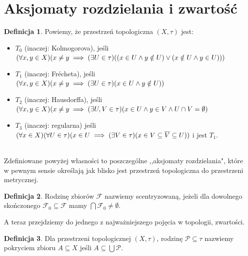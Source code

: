 \documentclass[12pt, a4paper, 2.5cm]{article}
\theoremstyle{definition}
\newtheorem{definition}{Definicja}
\begin{document}
	\section{Aksjomaty rozdzielania i zwartość}
	\begin{definition}
		Powiemy, że przestrzeń topologiczna $(X,\tau)$ jest:
		\begin{itemize}
			\item $T_0$ (inaczej: Kolmogorova), jeśli\\ $(\forall \mathnormal{x,y} \in X)(\mathnormal{x\neq y}\implies (\exists \mathnormal{U}\in \tau)((\mathnormal{x}\in\mathnormal{U} \land \mathnormal{y} \notin\mathnormal{U})\lor(\mathnormal{x}\notin\mathnormal{U} \wedge \mathnormal{y} \in\mathnormal{U})))$
			\item $T_1$ (inaczej: Fr\'echeta), jeśli\\ $(\forall \mathnormal{x,y} \in X)(\mathnormal{x\neq y}\implies (\exists \mathnormal{U}\in \tau)(\mathnormal{x}\in\mathnormal{U} \land \mathnormal{y} \notin\mathnormal{U}))$
			\item $T_2$ (inaczej: Hausdorffa), jeśli\\ $(\forall \mathnormal{x,y} \in X)(\mathnormal{x\neq y}\implies (\exists \mathnormal{U,V}\in \tau)(\mathnormal{x}\in\mathnormal{U} \land \mathnormal{y} \in\mathnormal{V} \land \mathnormal{U}\cap\mathnormal{V}=\emptyset)$
			\item $T_3$ (inaczej: regularna) jeśli\\ $(\forall \mathnormal{x}\in X)(\forall\mathnormal{U} \in\tau)(\mathnormal{x}\in\mathnormal{U}\implies(\exists\mathnormal{V}\in\tau)(\mathnormal{x}\in\mathnormal{V}\subseteq\mathnormal{\overline{V}}\subseteq\mathnormal{U}))$ i jest $T_1$.
		\end{itemize}
	\end{definition}
	\text{}\\
	Zdefiniowane powyżej własności to poszczególne ,,aksjomaty rozdzielania", które w pewnym sensie określają jak blisko jest przestrzeń topologiczna do przestrzeni metrycznej.
	\begin{definition}
		Rodzinę zbiorów $\mathcal{F}$ nazwiemy scentryzowaną, jeżeli dla dowolnego skończonego $\mathcal{F}_0\subseteq\mathcal{F}$ mamy $\bigcap\mathcal{F}_0\neq\emptyset$.
	\end{definition}
	A teraz przejdziemy do jednego z najważniejszego pojęcia w topologii, zwartości.
	\begin{definition}
		Dla przestrzeni topologicznej $(X,\tau)$, rodzinę $\mathcal{P}\subseteq\tau$ nazwiemy pokryciem zbioru $A\subseteq X$ jeśli $A\subseteq\bigcup\mathcal{P}$.
	\end{definition}
\end{document}
